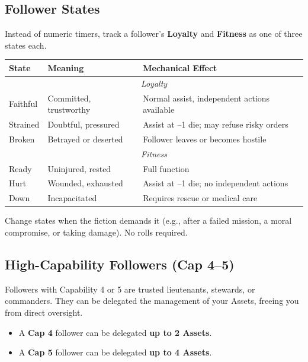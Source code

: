 \subsection*{Follower States}
\label{sec:follower-states}
Instead of numeric timers, track a follower's \textbf{Loyalty} and \textbf{Fitness} as one of three states each.

\begin{center}
\small
\begin{tabular}{lll}
\toprule
\textbf{State} & \textbf{Meaning} & \textbf{Mechanical Effect} \\
\midrule
\multicolumn{3}{c}{\textit{Loyalty}} \\
Faithful & Committed, trustworthy & Normal assist, independent actions available \\
Strained & Doubtful, pressured & Assist at --1 die; may refuse risky orders \\
Broken & Betrayed or deserted & Follower leaves or becomes hostile \\
\midrule
\multicolumn{3}{c}{\textit{Fitness}} \\
Ready & Uninjured, rested & Full function \\
Hurt & Wounded, exhausted & Assist at --1 die; no independent actions \\
Down & Incapacitated & Requires rescue or medical care \\
\bottomrule
\end{tabular}
\end{center}

Change states when the fiction demands it (e.g., after a failed mission, a moral compromise, or taking damage). No rolls required.

\subsection*{High-Capability Followers (Cap 4--5)}
\label{sec:high-cap-followers}
Followers with Capability 4 or 5 are trusted lieutenants, stewards, or commanders. They can be delegated the management of your Assets, freeing you from direct oversight.

\begin{itemize}
  \item A \textbf{Cap 4} follower can be delegated \textbf{up to 2 Assets}.
  \item A \textbf{Cap 5} follower can be delegated \textbf{up to 4 Assets}.
\end{itemize}

